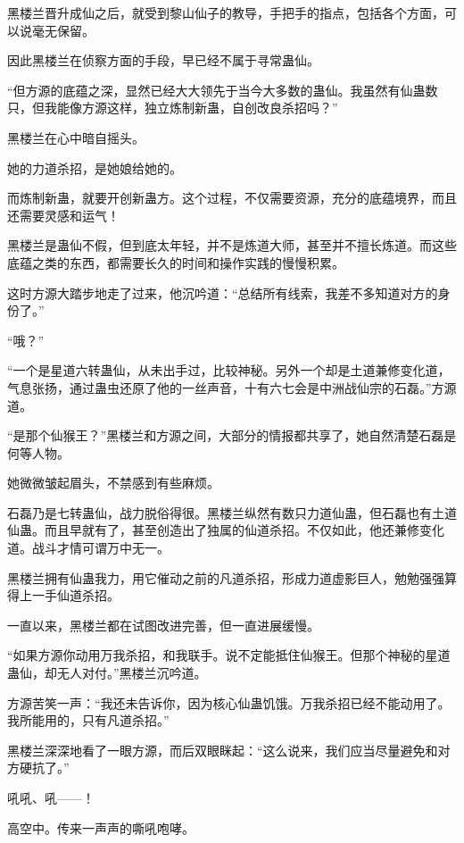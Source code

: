 
\begin{this_body}

黑楼兰晋升成仙之后，就受到黎山仙子的教导，手把手的指点，包括各个方面，可以说毫无保留。

因此黑楼兰在侦察方面的手段，早已经不属于寻常蛊仙。

“但方源的底蕴之深，显然已经大大领先于当今大多数的蛊仙。我虽然有仙蛊数只，但我能像方源这样，独立炼制新蛊，自创改良杀招吗？”

黑楼兰在心中暗自摇头。

她的力道杀招，是她娘给她的。

而炼制新蛊，就要开创新蛊方。这个过程，不仅需要资源，充分的底蕴境界，而且还需要灵感和运气！

黑楼兰是蛊仙不假，但到底太年轻，并不是炼道大师，甚至并不擅长炼道。而这些底蕴之类的东西，都需要长久的时间和操作实践的慢慢积累。

这时方源大踏步地走了过来，他沉吟道：“总结所有线索，我差不多知道对方的身份了。”

“哦？”

“一个是星道六转蛊仙，从未出手过，比较神秘。另外一个却是土道兼修变化道，气息张扬，通过蛊虫还原了他的一丝声音，十有六七会是中洲战仙宗的石磊。”方源道。

“是那个仙猴王？”黑楼兰和方源之间，大部分的情报都共享了，她自然清楚石磊是何等人物。

她微微皱起眉头，不禁感到有些麻烦。

石磊乃是七转蛊仙，战力脱俗得很。黑楼兰纵然有数只力道仙蛊，但石磊也有土道仙蛊。而且早就有了，甚至创造出了独属的仙道杀招。不仅如此，他还兼修变化道。战斗才情可谓万中无一。

黑楼兰拥有仙蛊我力，用它催动之前的凡道杀招，形成力道虚影巨人，勉勉强强算得上一手仙道杀招。

一直以来，黑楼兰都在试图改进完善，但一直进展缓慢。

“如果方源你动用万我杀招，和我联手。说不定能抵住仙猴王。但那个神秘的星道蛊仙，却无人对付。”黑楼兰沉吟道。

方源苦笑一声：“我还未告诉你，因为核心仙蛊饥饿。万我杀招已经不能动用了。我所能用的，只有凡道杀招。”

黑楼兰深深地看了一眼方源，而后双眼眯起：“这么说来，我们应当尽量避免和对方硬抗了。”

吼吼、吼——！

高空中。传来一声声的嘶吼咆哮。


\end{this_body}
